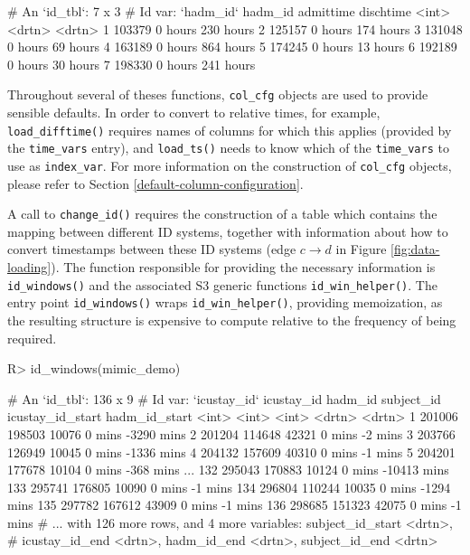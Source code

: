 \documentclass[
  notitle]{jss}
\begin{document}
\begin{CodeChunk}
\begin{CodeOutput}
# An `id_tbl`: 7 x 3
# Id var:      `hadm_id`
  hadm_id admittime dischtime
    <int> <drtn>    <drtn>
1  103379 0 hours   230 hours
2  125157 0 hours   174 hours
3  131048 0 hours    69 hours
4  163189 0 hours   864 hours
5  174245 0 hours    13 hours
6  192189 0 hours    30 hours
7  198330 0 hours   241 hours
\end{CodeOutput}
\end{CodeChunk}

Throughout several of theses functions, \texttt{col\_cfg} objects are
used to provide sensible defaults. In order to convert to relative
times, for example, \texttt{load\_difftime()} requires names of columns
for which this applies (provided by the \texttt{time\_vars} entry), and
\texttt{load\_ts()} needs to know which of the \texttt{time\_vars} to
use as \texttt{index\_var}. For more information on the construction of
\texttt{col\_cfg} objects, please refer to Section
\ref{default-column-configuration}.

A call to \texttt{change\_id()} requires the construction of a table
which contains the mapping between different ID systems, together with
information about how to convert timestamps between these ID systems
(edge \(c \to d\) in Figure \ref{fig:data-loading}). The function
responsible for providing the necessary information is
\texttt{id\_windows()} and the associated S3 generic functions
\texttt{id\_win\_helper()}. The entry point \texttt{id\_windows()} wraps
\texttt{id\_win\_helper()}, providing memoization, as the resulting
structure is expensive to compute relative to the frequency of being
required.

\begin{CodeChunk}
\begin{CodeInput}
R> id_windows(mimic_demo)
\end{CodeInput}
\begin{CodeOutput}
# An `id_tbl`: 136 x 9
# Id var:      `icustay_id`
    icustay_id hadm_id subject_id icustay_id_start hadm_id_start
         <int>   <int>      <int> <drtn>           <drtn>
  1     201006  198503      10076 0 mins            -3290 mins
  2     201204  114648      42321 0 mins               -2 mins
  3     203766  126949      10045 0 mins            -1336 mins
  4     204132  157609      40310 0 mins               -1 mins
  5     204201  177678      10104 0 mins             -368 mins
...
132     295043  170883      10124 0 mins           -10413 mins
133     295741  176805      10090 0 mins               -1 mins
134     296804  110244      10035 0 mins            -1294 mins
135     297782  167612      43909 0 mins               -1 mins
136     298685  151323      42075 0 mins               -1 mins
# ... with 126 more rows, and 4 more variables: subject_id_start <drtn>,
#   icustay_id_end <drtn>, hadm_id_end <drtn>, subject_id_end <drtn>
\end{CodeOutput}
\end{CodeChunk}
\end{document}
